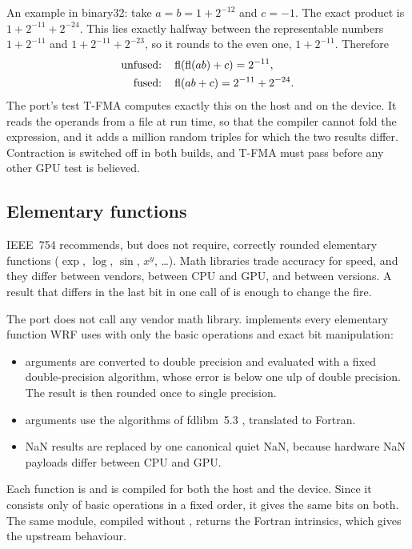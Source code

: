 An example in binary32: take $a = b = 1 + 2^{-12}$ and $c = -1$. The exact product is $1 + 2^{-11} + 2^{-24}$. This
lies exactly halfway between the representable numbers $1 + 2^{-11}$ and $1 + 2^{-11} + 2^{-23}$, so it rounds to
the even one, $1 + 2^{-11}$. Therefore
\begin{align}
  \text{unfused:}\quad & \operatorname{fl}(\operatorname{fl}(a b) + c) = 2^{-11},\\
  \text{fused:}\quad & \operatorname{fl}(a b + c) = 2^{-11} + 2^{-24}.
\end{align}
The port's test T-FMA computes exactly this on the host and on the device. It reads the operands from a file at run
time, so that the compiler cannot fold the expression, and it adds a million random triples for which the two
results differ. Contraction is switched off in both builds, and T-FMA must pass before any other GPU test is
believed.

\subsection{Elementary functions}

IEEE~754 recommends, but does not require, correctly rounded elementary functions ($\exp$, $\log$, $\sin$, $x^y$,
\dots). Math libraries trade accuracy for speed, and they differ between vendors, between CPU and GPU, and between
versions. A result that differs in the last bit in one call of  is enough to change the fire.

The port does not call any vendor math library.  implements every elementary function WRF
uses with only the basic operations and exact bit manipulation:
\begin{itemize}
  \item {} arguments are converted to double precision and evaluated with a fixed double-precision
    algorithm, whose error is below one ulp of double precision. The result is then rounded once to single
    precision.
  \item {} arguments use the algorithms of fdlibm~5.3 \citep{fdlibm}, translated to Fortran.
  \item NaN results are replaced by one canonical quiet NaN, because hardware NaN payloads differ between CPU and
    GPU.
\end{itemize}

Each function is  and is compiled for both the host and the device. Since it consists only of basic
operations in a fixed order, it gives the same bits on both. The same module, compiled without ,
returns the Fortran intrinsics, which gives the upstream behaviour.

